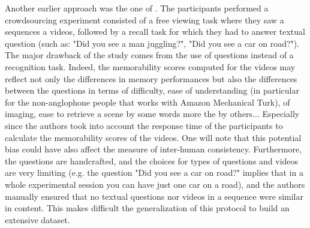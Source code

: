 \documentclass[sigconf]{acmart}
\begin{document}
Another earlier approach was the one of \cite{shekhar_2017_show}.
The participants performed a crowdsourcing experiment consisted of a free viewing task where they saw a sequences a videos, followed by a recall task for which they had to answer textual question (such as: "Did you see a man juggling?", "Did you see a car on road?").
The major drawback of the study comes from the use of questions instead of a recognition task.
Indeed, the memorability scores computed for the videos may reflect not only the differences in memory performances but also the differences between the questions in terms of difficulty, ease of understanding (in particular for the non-anglophone people that works with Amazon Mechanical Turk), of imaging, ease to retrieve a scene by some words more the by others... Especially since the authors took into account the response time of the participants to calculate the memorability scores of the videos. One will note that this potential bias could have also affect the measure of inter-human consistency.
Furthermore, the questions are handcrafted, and the choices for types of questions and videos are very limiting (e.g. the question "Did you see a car on road?" implies that in a whole experimental session you can have just one car on a road), and the authors manually ensured that no textual questions nor videos in a sequence were similar in content. This makes difficult the generalization of this protocol to build an extensive dataset.

\end{document}
